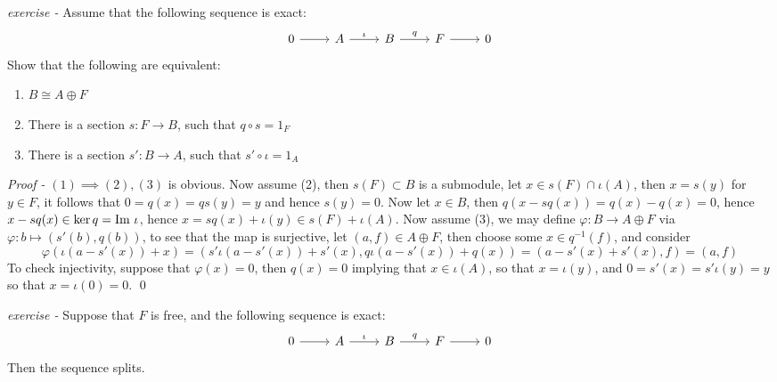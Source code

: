 \documentclass[11pt]{article}
\theoremstyle{definition}
\newcommand{\im}{\text{Im\,}}
\begin{document}

    \emph{exercise - }\label{CEx4} Assume that the following sequence is exact:
    \begin{equation*}
        \begin{tikzcd}
            0 \arrow[r,"{}"] & A \arrow[r,"{\iota}"] & B \arrow[r,"{q}"] & F \arrow[r,"{}"] & 0
        \end{tikzcd}
    \end{equation*}
    Show that the following are equivalent:
    \begin{enumerate}
        \item \(B \cong A \oplus F\)
        \item There is a section \(s: F \to B\), such that \(q \circ s = 1_F\)
        \item There is a section \(s': B \to A\), such that \(s' \circ \iota = 1_A\)
    \end{enumerate}

    \emph{Proof - } \((1) \implies (2),(3)\) is obvious. Now assume (2), then \(s(F) \subset B\) is a submodule, let \(x \in s(F) \cap \iota(A)\), then \(x = s(y)\) for \(y \in F\), it follows that \(0 = q(x) = qs(y) = y\) and hence \(s(y) = 0\). Now let \(x \in B\), then \(q(x - sq(x)) = q(x) - q(x) = 0\), hence \(x - sq(x) \in \ker q = \im \,\iota\), hence \(x = sq(x) + \iota(y) \in s(F) + \iota(A)\). Now assume (3), we may define \(\varphi: B \to A \oplus F\) via
    \(\varphi:b \mapsto (s'(b),q(b))\), to see that the map is surjective, let \((a,f) \in A \oplus F\), then choose some \(x \in q^{-1}(f)\), and consider \[\varphi(\iota(a - s'(x)) + x) = (s'\iota (a - s'(x)) + s'(x),q\iota(a-s'(x)) + q(x)) = (a - s'(x) + s'(x),f) = (a,f)\]
    To check injectivity, suppose that \(\varphi(x) = 0\), then \(q(x) = 0\) implying that \(x \in \iota(A)\), so that \(x = \iota(y)\), and \(0 = s'(x) = s'\iota(y) = y\) so that \(x = \iota(0) = 0\). \qed


    \emph{exercise - }\label{CEx5} Suppose that \(F\) is free, and the following sequence is exact:
    \begin{equation*}
        \begin{tikzcd}
            0 \arrow[r,"{}"] & A \arrow[r,"{\iota}"] & B \arrow[r,"{q}"] & F \arrow[r,"{}"] & 0
        \end{tikzcd}
    \end{equation*}
    Then the sequence splits.
\end{document}
